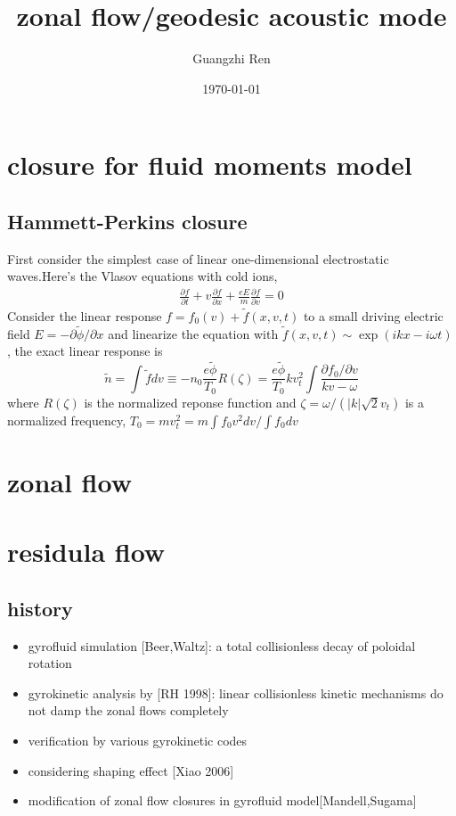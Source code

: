 \documentclass[11pt,a4paper]{article}
\title{zonal flow/geodesic acoustic mode}
\author{Guangzhi Ren}
\date{\today}
\begin{document}
	
	\maketitle


\section{closure for fluid moments model}
\subsection{Hammett-Perkins closure}
First consider the simplest case of linear one-dimensional electrostatic waves.Here's the Vlasov equations with cold ions,
	\begin{equation}
	\begin{aligned}
		\frac{\partial{f}}{\partial{t}}
		+v\frac{\partial{f}}{\partial{x}}
		+\frac{eE}{m}\frac{\partial{f}}{\partial{v}}=0
	\end{aligned}
	\end{equation}	
Consider the linear response $f=f_0(v)+\tilde{f}(x,v,t)$ to a small driving electric field $E=-\partial\tilde{\phi}/\partial{x}$ and linearize the equation with $\tilde{f}(x,v,t)\sim\exp(ikx-i\omega{t})$, the exact linear response is
	\begin{equation}
		\tilde{n}=\int\tilde{f}dv \equiv -n_0\frac{e\tilde{\phi}}{T_0}R(\zeta)
		=\frac{e\tilde{\phi}}{T_0}kv_t^2\int\frac{\partial{f_0}/\partial{v}}{kv-\omega}
	\end{equation}	
where $R(\zeta)$ is the normalized reponse function and $\zeta=\omega/(|k|\sqrt{2}v_t)$	is a normalized frequency, $T_0=mv_t^2=m\int{f_0}v^2dv/\int{f_0}dv$

	
	
\newpage	
\section{zonal flow}

\newpage
\section{residula flow}	

	\subsection{history}
	\begin{itemize}
		\item gyrofluid simulation [Beer,Waltz]: a total collisionless decay of poloidal rotation
		\item gyrokinetic analysis by [RH 1998]: linear collisionless kinetic mechanisms do not damp the zonal flows completely
		\item verification by various gyrokinetic codes
		\item considering shaping effect [Xiao 2006]
		\item modification of zonal flow closures in gyrofluid model[Mandell,Sugama]
	\end{itemize}
	
\end{document}
